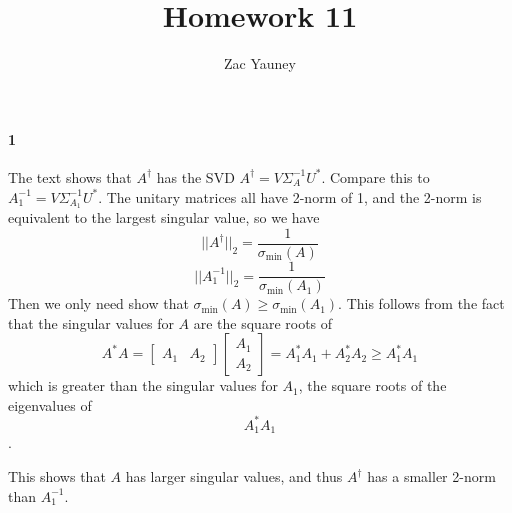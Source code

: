 \documentclass{article}
\title{Homework 11}
\author{Zac Yauney}
\begin{document}
\maketitle
\paragraph{1}
The text shows that $A^\dagger$ has the SVD $A^\dagger=V\Sigma_{A}^{-1} U^*$. Compare this to $A_1^{-1}=V \Sigma_{A_1}^{-1}U^*$. The unitary matrices all have 2-norm of 1, and the 2-norm is equivalent to the largest singular value, so we have
\[
	||A^\dagger||_2 = \frac{1}{\sigma_\text{min}(A)}
\]
\[
	||A_1^{-1}||_2 = \frac{1}{\sigma_\text{min}(A_1)}
\]
Then we only need show that $\sigma_\text{min}(A) \ge \sigma_\text{min}(A_1)$. This follows from the fact that the singular values for $A$ are the square roots of
\[
A^*A = \begin{bmatrix}
	A_1 & A_2
\end{bmatrix}
\begin{bmatrix}
A_1 \\
A_2
\end{bmatrix}
= A_1^*A_1+A_2^*A_2 \ge A_1^*A_1
\]
which is greater than the singular values for $A_1$, the square roots of the eigenvalues of
\[
A_1^*A_1
\].

This shows that $A$ has larger singular values, and thus $A^\dagger$ has a smaller 2-norm than $A_1^{-1}$.
\end{document}
